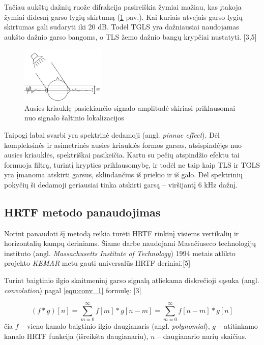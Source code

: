 \documentclass[]{vgtuef}
\begin{document}
Tačiau aukštų dažnių ruože difrakcija pasireiškia žymiai mažiau, kas įtakoja žymiai didesnį garso lygių skirtumą (\ref{fig:ILD_1} pav.). Kai kuriais atvejais garso lygių skirtumas gali sudaryti iki 20 dB. Todėl TGLS yra dažniausiai naudojamas aukšto dažnio garso bangoms, o TLS žemo dažnio bangų krypčiai nustatyti. [3,5]

\begin{figure}[!ht]
  \centering
  \includegraphics[width=150px]{img/ILD.jpg}
  \caption{Ausies kriauklę pasiekiančio signalo amplitudė skiriasi priklausomai nuo signalo šaltinio lokalizacijos}
  \label{fig:ILD_1}
\end{figure}

Taipogi labai svarbi yra spektrinė dedamoji (angl. \textit{pinnae effect}). Dėl kompleksinės ir asimetrinės ausies kriauklės formos garsas, atsispindėjęs nuo ausies kriauklės, spektriškai pasikeičia.  Kartu su pečių atspindžio efektu tai formuoja filtrą, turintį krypties priklausomybę, ir todėl ne taip kaip TLS ir TGLS yra įmanoma atskirti garsus, sklindančius iš priekio ir iš galo. Dėl spektrinių pokyčių ši dedamoji geriausiai tinka atskirti garsą -- viršijantį 6 kHz dažnį.


\subsection{HRTF metodo panaudojimas}

Norint panaudoti šį metodą reikia turėti HRTF rinkinį visiems vertikalių ir horizontalių kampų deriniams. Šiame darbe naudojami Masačiuseco technologijų instituto (angl. \textit{Massachusetts Institute of Technology}) 1994 metais atlikto projekto \textit{KEMAR} metu gauti universalūs HRTF deriniai.[5]

Turint baigtinio ilgio skaitmeninį garso signalą atliekama diskrečioji sąsuka (angl. \textit{convolution}) pagal \ref{equ:conv_1} formulę: [3]

\begin{equation}
(f * g)[n] = \sum_{m=0}^{\infty} f[m]*g[n-m]=\sum_{m=0}^{\infty} f[n-m]*g[n]
  \label{equ:conv_1}
\end{equation}
\noindent
čia $f$ – vieno kanalo baigtinio ilgio daugianaris (angl. \textit{polynomial}), $g$ – atitinkamo kanalo HRTF funkcija (išreikšta daugianariu), $n$ – daugianario narių skaičius.
\end{document}
